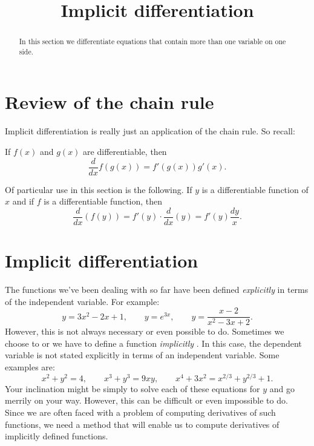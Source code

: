 \documentclass{ximera}
\title[Dig-In:]{Implicit differentiation}
\begin{document}
\begin{abstract}
In this section we differentiate equations that contain more than one variable on one side.
\end{abstract}
\maketitle
\section{Review of the chain rule}

Implicit differentiation is really just an application of the chain rule.
So recall:

\begin{theorem}
If $f(x)$ and $g(x)$ are differentiable, then
\[
\frac{d}{dx} f(g(x)) = f'(g(x))g'(x).
\]
\end{theorem}

Of particular use in this section is the following.  
If $y$ is a differentiable function of $x$ and if $f$ is a differentiable function, then
\[
\frac{d}{dx} (f(y)) = f'(y) \cdot \frac{d}{dx} (y) = f'(y) \frac{dy}{x}.
\]


\section{Implicit differentiation}

The functions we've been dealing with so far have been
defined \textit{explicitly}
 in terms of the independent
variable. For example:
\[
y=3x^2-2x+1,\qquad y=e^{3x}, \qquad y = \frac{x-2}{x^2-3x+2}.
\]
However, this is not always  necessary or even possible to do. Sometimes we choose to or we have to define a function  \textit{implicitly
 }. In this case, the dependent variable is not stated
explicitly in terms of an independent variable. Some examples are:
\[
x^2+y^2 = 4,\qquad x^3+y^3 = 9xy, \qquad x^4+3x^2 = x^{2/3}+y^{2/3} + 1.
\]
Your inclination might be simply to solve each of these equations for $y$ and go
merrily on your way. However, this can be difficult or even impossible to do.
Since we are often faced with a problem of computing derivatives of such functions,
we need a  method that will enable us to compute derivatives of implicitly defined functions.
  
\end{document}
